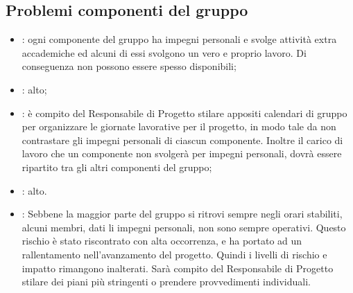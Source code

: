 \subsection{Problemi componenti del gruppo}
\begin{itemize}
\item {}: ogni componente del gruppo ha impegni personali e svolge attività extra accademiche ed alcuni di essi svolgono un vero e proprio lavoro. Di conseguenza non possono essere spesso disponibili;
\item {}: alto;
\item {}: è compito del Responsabile di Progetto stilare appositi calendari di gruppo per organizzare le giornate lavorative per il progetto, in modo tale da non contrastare gli impegni personali di ciascun componente. Inoltre il carico di lavoro che un componente non svolgerà per impegni personali, dovrà essere ripartito tra gli altri componenti del gruppo;
\item {}: alto.
\item {}: Sebbene la maggior parte del gruppo si ritrovi sempre negli orari stabiliti, alcuni membri, dati li impegni personali, non sono sempre operativi. Questo rischio è stato riscontrato con alta occorrenza, e ha portato ad un rallentamento nell'avanzamento del progetto. Quindi i livelli di rischio e impatto rimangono inalterati. Sarà compito del Responsabile di Progetto stilare dei piani più stringenti o prendere provvedimenti individuali.
\end{itemize}

